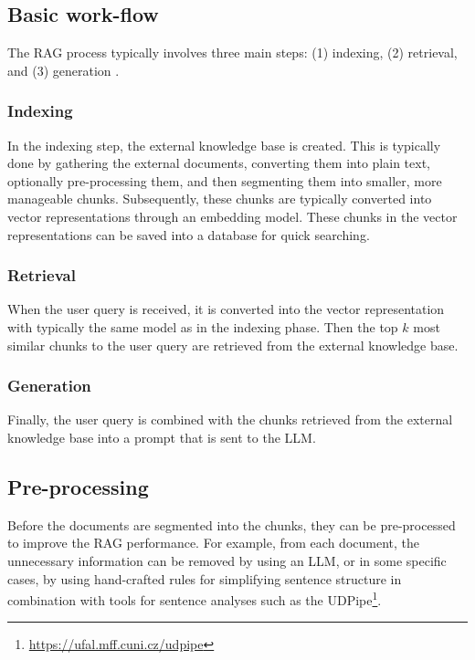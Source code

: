 \subsection{Basic work-flow}

The RAG process typically involves three main steps: (1) indexing, (2) retrieval, and (3) generation \cite{Gao2023}.


\subsubsection{Indexing}

In the indexing step, the external knowledge base is created. This is typically done by gathering the external documents, converting them into plain text, optionally pre-processing them, and then segmenting them into smaller, more manageable chunks. Subsequently, these chunks are typically converted into vector representations through an embedding model. These chunks in the vector representations can be saved into a database for quick searching.


\subsubsection{Retrieval}

When the user query is received, it is converted into the vector representation with typically the same model as in the indexing phase. Then the top $k$ most similar chunks to the user query are retrieved from the external knowledge base.


\subsubsection{Generation}

Finally, the user query is combined with the chunks retrieved from the external knowledge base into a prompt that is sent to the LLM.


\subsection{Pre-processing}

Before the documents are segmented into the chunks, they can be pre-processed to improve the RAG performance. For example, from each document, the unnecessary information can be removed by using an LLM, or in some specific cases, by using hand-crafted rules for simplifying sentence structure in combination with tools for sentence analyses such as the UDPipe\footnote{\url{https://ufal.mff.cuni.cz/udpipe}}.


